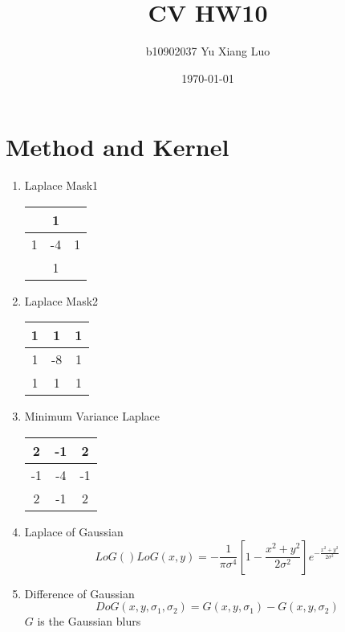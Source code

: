 \documentclass{article}
\begin{document}
\title{CV HW10}
\author{b10902037 Yu Xiang Luo}
\date{\today}
\maketitle

\section{Method and Kernel}
\begin{enumerate}
	\item Laplace Mask1 \\ 
		\begin{table}[h!]
			\centering
			\begin{tabular}{|c|c|c|}
				\hline
				& 1 & \\
				\hline
				1 & -4 & 1 \\
				\hline
				  & 1 & \\
				  \hline
			\end{tabular}
		\end{table}
	\item Laplace Mask2 \\
		\begin{table}[h!]
			\centering
			\begin{tabular}{|c|c|c|}
				\hline
				1 & 1 & 1\\
				\hline
				1 & -8 & 1 \\
				\hline
				1  & 1 & 1\\
				  \hline
			\end{tabular}
		\end{table}
	\item Minimum Variance Laplace
		\begin{table}[h!]
			\centering
			\begin{tabular}{|c|c|c|}
				\hline
				2 & -1 & 2\\
				\hline
				-1 & -4 & -1 \\
				\hline
				2  & -1 & 2\\
				  \hline
			\end{tabular}
		\end{table}
	\item Laplace of Gaussian
		$$LoG()LoG(x,y) = -\frac{1}{\pi \sigma ^4} [1 - \frac{x^2 + y^2}{2 \sigma ^2}] e^{-\frac{x^2+y^2}{2 \sigma ^2}}$$
	\item Difference of Gaussian\\
		$$DoG(x,y, \sigma_1, \sigma_2) = G(x,y,\sigma_1) - G(x,y,\sigma_2)$$
		$G$ is the Gaussian blurs

\end{enumerate}
\end{document}
